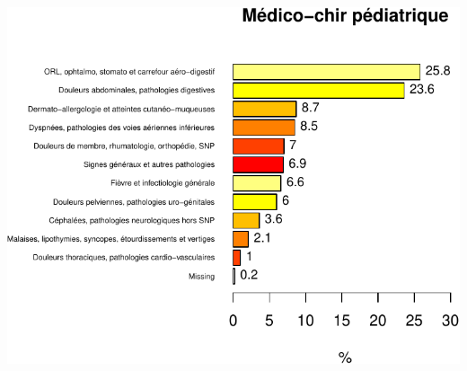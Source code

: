 \documentclass[]{article}
\begin{document}
\includegraphics{analyse_merge_files/figure-latex/chap_ped_med-1.pdf}\\
\end{document}
